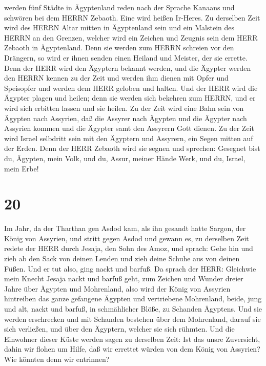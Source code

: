 werden fünf Städte in Ägyptenland reden nach der Sprache Kanaans und
schwören bei dem HERRN Zebaoth. Eine wird heißen Ir-Heres. 
Zu derselben Zeit wird des HERRN Altar mitten in Ägyptenland sein und
ein Malstein des HERRN an den Grenzen,  welcher wird ein
Zeichen und Zeugnis sein dem HERR Zebaoth in Ägyptenland. Denn sie
werden zum HERRN schreien vor den Drängern, so wird er ihnen senden
einen Heiland und Meister, der sie errette.  Denn der HERR
wird den Ägyptern bekannt werden, und die Ägypter werden den HERRN
kennen zu der Zeit und werden ihm dienen mit Opfer und Speisopfer und
werden dem HERR geloben und halten.  Und der HERR wird die
Ägypter plagen und heilen; denn sie werden sich bekehren zum HERRN, und
er wird sich erbitten lassen und sie heilen.  Zu der Zeit
wird eine Bahn sein von Ägypten nach Assyrien, daß die Assyrer nach
Ägypten und die Ägypter nach Assyrien kommen und die Ägypter samt den
Assyrern Gott dienen.  Zu der Zeit wird Israel selbdritt
sein mit den Ägyptern und Assyrern, ein Segen mitten auf der Erden.
 Denn der HERR Zebaoth wird sie segnen und sprechen:
Gesegnet bist du, Ägypten, mein Volk, und du, Assur, meiner Hände Werk,
und du, Israel, mein Erbe!

\hypertarget{section-19}{%
\section{20}\label{section-19}}

 Im Jahr, da der Tharthan gen Asdod kam, als ihn gesandt
hatte Sargon, der König von Assyrien, und stritt gegen Asdod und gewann
es,  zu derselben Zeit redete der HERR durch Jesaja, den
Sohn des Amoz, und sprach: Gehe hin und zieh ab den Sack von deinen
Lenden und zieh deine Schuhe aus von deinen Füßen. Und er tut also, ging
nackt und barfuß.  Da sprach der HERR: Gleichwie mein Knecht
Jesaja nackt und barfuß geht, zum Zeichen und Wunder dreier Jahre über
Ägypten und Mohrenland,  also wird der König von Assyrien
hintreiben das ganze gefangene Ägypten und vertriebene Mohrenland,
beide, jung und alt, nackt und barfuß, in schmählicher Blöße, zu
Schanden Ägyptens.  Und sie werden erschrecken und mit
Schanden bestehen über dem Mohrenland, darauf sie sich verließen, und
über den Ägyptern, welcher sie sich rühmten.  Und die
Einwohner dieser Küste werden sagen zu derselben Zeit: Ist das unsre
Zuversicht, dahin wir flohen um Hilfe, daß wir errettet würden von dem
König von Assyrien? Wie könnten denn wir entrinnen?

